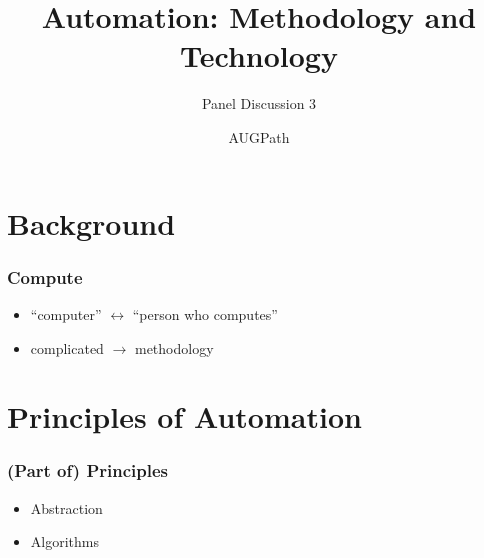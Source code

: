 \documentclass[11pt]{beamer}
\begin{document}
	\author{AUGPath}
	\title[Automation]{Automation: Methodology and Technology}
	\subtitle{Panel Discussion 3}
	\begin{frame}[plain]
		\maketitle
	\end{frame}

	\section{Background}
	\begin{frame}
		\frametitle{Compute}
		\begin{itemize}
			\item ``computer'' $\leftrightarrow$ ``person who computes'' \pause
			\item complicated $\rightarrow$ methodology
		\end{itemize}
	\end{frame}

	\section{Principles of Automation}
	\begin{frame}
		\frametitle{(Part of) Principles}
	
		\begin{itemize}
			\item Abstraction
			\item Algorithms
		\end{itemize}
	
	\end{frame}
\end{document}
